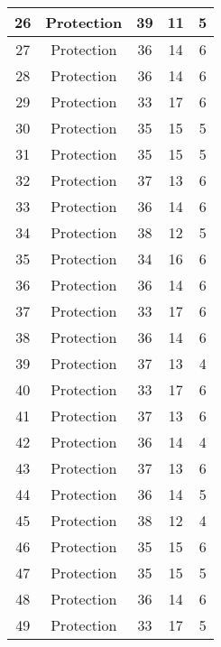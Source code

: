 \documentclass[results.tex]{subfiles}
\begin{document}
\begin{center}
\begin{tabular}{| c || c | c | c | c |}
    \hline
    26 & Protection & 39 & 11 & 5 \\ 
    \hline
    27 & Protection & 36 & 14 & 6 \\ 
    \hline
    28 & Protection & 36 & 14 & 6 \\ 
    \hline
    29 & Protection & 33 & 17 & 6 \\ 
    \hline
    30 & Protection & 35 & 15 & 5 \\ 
    \hline
    31 & Protection & 35 & 15 & 5 \\ 
    \hline
    32 & Protection & 37 & 13 & 6 \\ 
    \hline
    33 & Protection & 36 & 14 & 6 \\ 
    \hline
    34 & Protection & 38 & 12 & 5 \\ 
    \hline
    35 & Protection & 34 & 16 & 6 \\ 
    \hline
    36 & Protection & 36 & 14 & 6 \\ 
    \hline
    37 & Protection & 33 & 17 & 6 \\ 
    \hline
    38 & Protection & 36 & 14 & 6 \\ 
    \hline
    39 & Protection & 37 & 13 & 4 \\ 
    \hline
    40 & Protection & 33 & 17 & 6 \\ 
    \hline
    41 & Protection & 37 & 13 & 6 \\ 
    \hline
    42 & Protection & 36 & 14 & 4 \\ 
    \hline
    43 & Protection & 37 & 13 & 6 \\ 
    \hline
    44 & Protection & 36 & 14 & 5 \\ 
    \hline
    45 & Protection & 38 & 12 & 4 \\ 
    \hline
    46 & Protection & 35 & 15 & 6 \\ 
    \hline
    47 & Protection & 35 & 15 & 5 \\ 
    \hline
    48 & Protection & 36 & 14 & 6 \\ 
    \hline
    49 & Protection & 33 & 17 & 5 \\ 
    \hline   \end{tabular}
\end{center}
\end{document}
